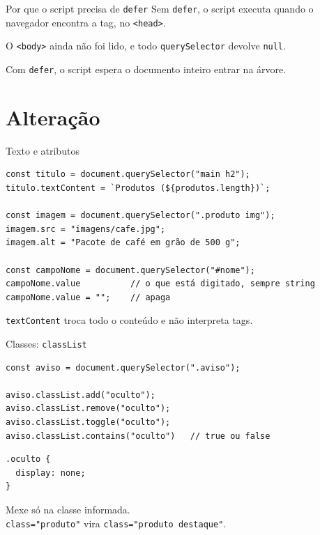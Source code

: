 \documentclass{beamer}
\begin{document}
\begin{frame}{Por que o script precisa de \texttt{defer}}
	Sem \texttt{defer}, o script executa quando o navegador encontra a tag, no
	\texttt{<head>}.

	\vspace{0.3cm}
	O \texttt{<body>} ainda não foi lido, e todo \texttt{querySelector} devolve
	\texttt{null}.

	\vspace{0.3cm}
	Com \texttt{defer}, o script espera o documento inteiro entrar na árvore.
\end{frame}

\section{Alteração}

\begin{frame}[fragile]{Texto e atributos}
	\begin{verbatim}
const titulo = document.querySelector("main h2");
titulo.textContent = `Produtos (${produtos.length})`;

const imagem = document.querySelector(".produto img");
imagem.src = "imagens/cafe.jpg";
imagem.alt = "Pacote de café em grão de 500 g";

const campoNome = document.querySelector("#nome");
campoNome.value          // o que está digitado, sempre string
campoNome.value = "";    // apaga
	\end{verbatim}

	\vspace{0.2cm}
	\texttt{textContent} troca todo o conteúdo e não interpreta tags.
\end{frame}

\begin{frame}[fragile]{Classes: \texttt{classList}}
	\begin{verbatim}
const aviso = document.querySelector(".aviso");

aviso.classList.add("oculto");
aviso.classList.remove("oculto");
aviso.classList.toggle("oculto");
aviso.classList.contains("oculto")   // true ou false
	\end{verbatim}

	\begin{verbatim}
.oculto {
  display: none;
}
	\end{verbatim}

	\vspace{0.2cm}
	Mexe só na classe informada.\\
	\texttt{class="produto"} vira \texttt{class="produto destaque"}.
\end{frame}
\end{document}
